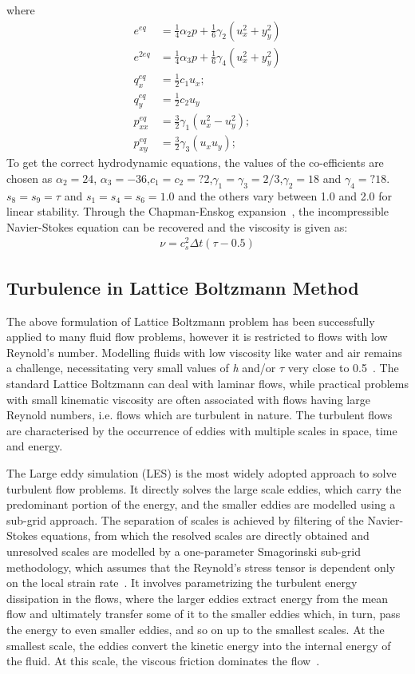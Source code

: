 \flushleft where
\begin{align}
e^{eq} & =\frac{1}{4}\alpha_2p+\frac{1}{6}\gamma_2(u_x^2+y_y^2)\\
e^{2eq} & =\frac{1}{4}\alpha_3p+\frac{1}{6}\gamma_4(u_x^2+y_y^2)\\
q_x^{eq} & =\frac{1}{2}c_1u_x;\\
q_y^{eq} & =\frac{1}{2}c_2u_y \\
p_{xx}^{eq} & =\frac{3}{2}\gamma_1(u_x^2 - u_y^2);\\
p_{xy}^{eq} & =\frac{3}{2}\gamma_3(u_xu_y);
\end{align}
To get the correct hydrodynamic equations, the values of the co-efficients are chosen as $\alpha_2=24$, $\alpha_3=-36$,$c_1=c_2=?2$,$\gamma_1=\gamma_3
=2/3$,$\gamma_2=18$ and $\gamma_4=?18$. $s_8 = s_9 = \tau$ and $s_1=s_4=s_6=1.0$ and the others vary between 1.0 and 2.0 for linear stability. Through the Chapman-Enskog expansion~\citep{Du2006}, the incompressible Navier-Stokes equation can be recovered and the viscosity is given as:
\begin{align}
\nu=c_s^2\Delta t(\tau-0.5)
\end{align}

\subsection{Turbulence in Lattice Boltzmann Method}
The above formulation of Lattice Boltzmann problem has been successfully applied to many fluid flow problems, however it is restricted to flows with low Reynold's number. Modelling fluids with low viscosity like water and air remains a challenge, necessitating very small values of \textit{h} and/or $\tau$ very close to 0.5~\citep{He1997}. The standard Lattice Boltzmann can deal with laminar flows, while practical problems with small kinematic viscosity are often associated with flows having large Reynold numbers, i.e. flows which are turbulent in nature. The turbulent flows are characterised by the occurrence of eddies with multiple scales in space, time and energy.

The Large eddy simulation (LES) is the most widely adopted approach to solve turbulent flow problems. It directly solves the large scale eddies, which carry the predominant portion of the energy, and the smaller eddies are modelled using a sub-grid approach. The separation of scales is achieved by filtering of the Navier-Stokes equations, from which the resolved scales are directly obtained and unresolved scales are modelled by a one-parameter Smagorinski sub-grid methodology, which assumes that the Reynold's stress tensor is dependent only on the local strain rate~\citep{smagorinsky1963}. It involves parametrizing the turbulent energy dissipation in the flows, where the larger eddies extract energy from the mean flow and ultimately transfer some of it to the smaller eddies which, in turn, pass the energy to even smaller eddies, and so on up to the smallest scales. At the smallest scale, the eddies convert the kinetic energy into the internal energy of the fluid. At this scale, the viscous friction dominates the flow~\citep{frisch1995}.



